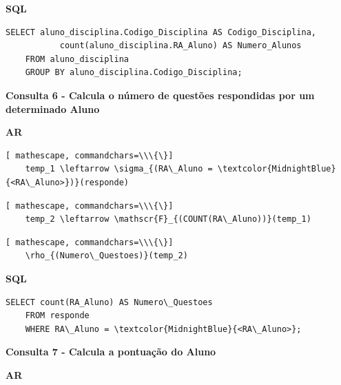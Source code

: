 \documentclass[12pt,a4paper]{article}
\begin{document}
\begin{center}
    \textbf{SQL}
\end{center}

\begin{Verbatim}[commandchars=\\\{\}]
    SELECT aluno_disciplina.Codigo_Disciplina AS Codigo_Disciplina,
           count(aluno_disciplina.RA_Aluno) AS Numero_Alunos
    FROM aluno_disciplina 
    GROUP BY aluno_disciplina.Codigo_Disciplina;
\end{Verbatim}

\vspace{0.5cm}
\begin{center}
    \textbf{Consulta 6 - Calcula o número de questões respondidas por um determinado Aluno}
\end{center}
\begin{center}
    \textbf{AR}
\end{center}

\begin{Verbatim}[ mathescape, commandchars=\\\{\}]
    temp_1 \leftarrow \sigma_{(RA\_Aluno = \textcolor{MidnightBlue}{<RA\_Aluno>})}(responde)
\end{Verbatim}
\begin{Verbatim}[ mathescape, commandchars=\\\{\}]
    temp_2 \leftarrow \mathscr{F}_{(COUNT(RA\_Aluno))}(temp_1)
\end{Verbatim}
\begin{Verbatim}[ mathescape, commandchars=\\\{\}]
    \rho_{(Numero\_Questoes)}(temp_2)
\end{Verbatim}

\begin{center}
    \textbf{SQL}
\end{center}
\begin{Verbatim}[commandchars=\\\{\}]
    SELECT count(RA_Aluno) AS Numero\_Questoes 
    FROM responde 
    WHERE RA\_Aluno = \textcolor{MidnightBlue}{<RA\_Aluno>};
\end{Verbatim}

\vspace{0.5cm}
\begin{center}
    \textbf{Consulta 7 - Calcula a pontuação do Aluno}
\end{center}
\begin{center}
    \textbf{AR}
\end{center}
\end{document}
